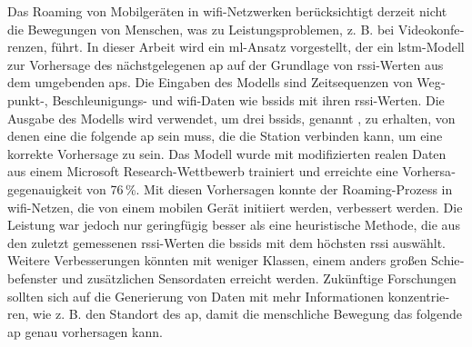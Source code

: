 \null\vfil
\begin{otherlanguage}{ngerman}
\begin{center}\textsf{\textbf{\abstractname}}\end{center}

\noindent
Das Roaming von Mobilgeräten in \ac{wifi}-Netzwerken berücksichtigt derzeit nicht die Bewegungen von Menschen, was zu Leistungsproblemen, z. B. bei Videokonferenzen, führt.
In dieser Arbeit wird ein \ac{ml}-Ansatz vorgestellt, der ein \ac{lstm}-Modell zur Vorhersage des nächstgelegenen \ac{ap} auf der Grundlage von \ac{rssi}-Werten aus dem umgebenden \acp{ap}.
Die Eingaben des Modells sind Zeitsequenzen von Wegpunkt-, Beschleunigungs- und \ac{wifi}-Daten wie \acp{bssid} mit ihren \ac{rssi}-Werten.
Die Ausgabe des Modells wird verwendet, um drei \acp{bssid}, genannt \threeAP, zu erhalten, von denen eine die folgende \ac{ap} sein muss, die die Station verbinden kann, um eine korrekte Vorhersage zu sein.
Das Modell wurde mit modifizierten realen Daten aus einem Microsoft Research-Wettbewerb trainiert und erreichte eine Vorhersagegenauigkeit von 76\,\%.
Mit diesen Vorhersagen konnte der Roaming-Prozess in \ac{wifi}-Netzen, die von einem mobilen Gerät initiiert werden, verbessert werden.
Die Leistung war jedoch nur geringfügig besser als eine heuristische Methode, die aus den zuletzt gemessenen \ac{rssi}-Werten die \acp{bssid} mit dem höchsten \ac{rssi} auswählt.
Weitere Verbesserungen könnten mit weniger Klassen, einem anders großen Schiebefenster und zusätzlichen Sensordaten erreicht werden.
Zukünftige Forschungen sollten sich auf die Generierung von Daten mit mehr Informationen konzentrieren, wie z. B. den Standort des \ac{ap}, damit die menschliche Bewegung das folgende \ac{ap} genau vorhersagen kann.
\end{otherlanguage}
\vfil\null

\acresetall
